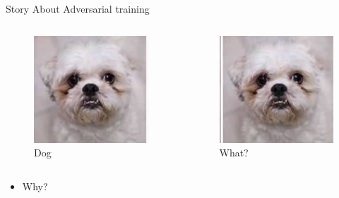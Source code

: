 \begin{frame}[fragile]{Story About Adversarial training}
	\begin{columns}[onlytextwidth]
		
		\begin{figure}
			\caption{Dog}
			\includegraphics[height=0.5\textheight]{fig0.jpg}
		\end{figure}
	
		\begin{figure}
			\caption{What?}
			\includegraphics[height=0.5\textheight]{fig2.jpg}
		\end{figure}
	
		\end{columns}
		\begin{itemize}
			\item Why?
		\end{itemize}
				
		

\end{frame}
